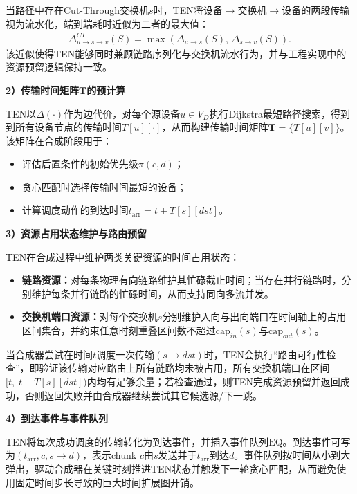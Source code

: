 当路径中存在Cut-Through交换机$s$时，TEN将设备$\rightarrow$交换机$\rightarrow$设备的两段传输视为流水化，端到端耗时近似为二者的最大值：
\begin{align}
\Delta_{u\rightarrow s\rightarrow v}^{CT}(S)=\max\left(\Delta_{u\rightarrow s}(S),\,\Delta_{s\rightarrow v}(S)\right). \label{eq:ftacas-ct}
\end{align}
该近似使得TEN能够同时兼顾链路序列化与交换机流水行为，并与工程实现中的资源预留逻辑保持一致。

\noindent\quad\textbf{2）传输时间矩阵$\boldsymbol{T}$的预计算}

\label{subsec:ftacas-ten-shortest}
TEN以$\Delta(\cdot)$作为边代价，对每个源设备$u\in V_D$执行Dijkstra最短路径搜索，得到到所有设备节点的传输时间$T[u][\cdot]$，从而构建传输时间矩阵$\boldsymbol{T}=\{T[u][v]\}$。该矩阵在合成阶段用于：
\begin{itemize}
    \item 评估后置条件的初始优先级$\pi(c,d)$；
    \item 贪心匹配时选择传输时间最短的设备；
    \item 计算调度动作的到达时间$t_{\mathrm{arr}}=t+T[s][dst]$。
\end{itemize}

\noindent\quad\textbf{3）资源占用状态维护与路由预留}

\label{subsec:ftacas-ten-reserve}
TEN在合成过程中维护两类关键资源的时间占用状态：
\begin{itemize}
    \item \textbf{链路资源：}对每条物理有向链路维护其忙碌截止时间；当存在并行链路时，分别维护每条并行链路的忙碌时间，从而支持同向多流并发。
    \item \textbf{交换机端口资源：}对每个交换机$s$分别维护入向与出向端口在时间轴上的占用区间集合，并约束任意时刻重叠区间数不超过$\mathrm{cap}_{in}(s)$与$\mathrm{cap}_{out}(s)$。
\end{itemize}

当合成器尝试在时间$t$调度一次传输$(s\rightarrow dst)$时，TEN会执行“路由可行性检查”，即验证该传输对应路由上所有链路均未被占用，所有交换机端口在区间$[t,\;t+T[s][dst])$内均有足够余量；若检查通过，则TEN完成资源预留并返回成功，否则返回失败并由合成器继续尝试其它候选源/下一跳。

\noindent\quad\textbf{4）到达事件与事件队列}

TEN将每次成功调度的传输转化为到达事件，并插入事件队列$\mathrm{EQ}$。到达事件可写为$(t_{\mathrm{arr}},c,s\rightarrow d)$，表示chunk $c$由$s$发送并于$t_{\mathrm{arr}}$到达$d$。事件队列按时间从小到大弹出，驱动合成器在关键时刻推进TEN状态并触发下一轮贪心匹配，从而避免使用固定时间步长导致的巨大时间扩展图开销。


